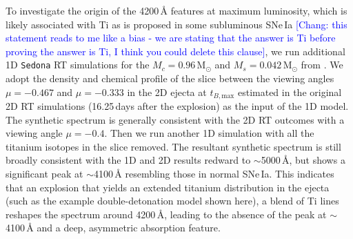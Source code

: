 \documentclass[twocolumn]{aastex631}
\newcommand{\chang}[1]{\textcolor{blue}{[Chang: #1]}}
\begin{document}
\begin{CJK*}{UTF8}{gbsn}
To investigate the origin of the 4200\,\r{A} features at maximum luminosity, which is likely associated with Ti as is proposed in some subluminous SNe\,Ia \chang{this statement reads to me like a bias - we are stating that the answer is Ti before proving the answer is Ti, I think you could delete this clause}, we run additional 1D \texttt{Sedona} RT simulations for the $M_c=0.96\,\mathrm{M_\odot}$ and $M_s=0.042\,\mathrm{M_\odot}$ from \citet[adopted in the calculations of \citealp{Shen_2D_2021}]{Boos_2021}. We adopt the density and chemical profile of the slice between the viewing angles $\mu=-0.467$ and $\mu=-0.333$ in the 2D ejecta at $t_{B,\mathrm{max}}$ estimated in the original 2D RT simulations (16.25\,days after the explosion) as the input of the 1D model. The synthetic spectrum is generally consistent with the 2D RT outcomes with a viewing angle $\mu=-0.4$. Then we run another 1D simulation with all the titanium isotopes in the slice removed. The resultant synthetic spectrum is still broadly consistent with the 1D and 2D results redward to $\sim$5000\,\r{A}, but shows a significant peak at $\sim$4100\,\r{A} resembling those in normal SNe\,Ia. This indicates that an explosion that yields an extended titanium distribution in the ejecta (such as the example double-detonation model shown here), a blend of Ti lines reshapes the spectrum around 4200\,\r{A}, leading to the absence of the peak at $\sim$4100\,\r{A} and a deep, asymmetric absorption feature. %


\end{CJK*}
\end{document}
